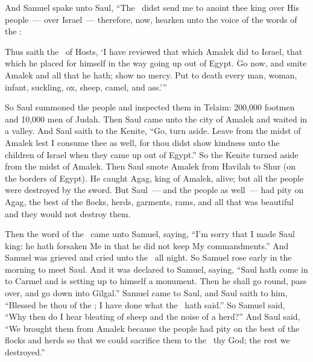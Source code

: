 
\begin{inparaenum}
   And Samuel spake unto Saul, ``The \lord\ didst send me to anoint thee king over His people~--- over Israel~--- therefore, now, hearken unto the voice of the words of the \lord:%

   Thus saith the \lord\ of Hosts, `I have reviewed that which Amalek did to Israel, that which he placed for himself in the way going up out of Egypt.%
   Go now, and smite Amalek and all that he hath; show no mercy. Put to death every man, woman, infant, suckling, ox, sheep, camel, and ass.'''%

   So Saul summoned the people and inspected them in Telaim: 200,000 footmen and 10,000 men of Judah.%
   Then Saul came unto the city of Amalek and waited in a valley.%
   And Saul saith to the Kenite, ``Go, turn aside. Leave from the midst of Amalek lest I consume thee as well, for thou didst show kindness unto the children of Israel when they came up out of Egypt.'' So the Kenite turned aside from the midst of Amalek.%
   Then Saul smote Amalek from Havilah to Shur (on the borders of Egypt).%
   He caught Agag, king of Amalek, alive; but all the people were destroyed by the sword.%
   But Saul~--- and the people as well~--- had pity on Agag, the best of the flocks, herds, garments, rams, and all that was beautiful and they would not destroy them.%

   Then the word of the \lord\ came unto Samuel, saying,%
   ``I'm sorry that I made Saul king: he hath forsaken Me in that he did not keep My commandments.'' And Samuel was grieved and cried unto the \lord\ all night.%
   So Samuel rose early in the morning to meet Saul. And it was declared to Samuel, saying, ``Saul hath come in to Carmel and is setting up to himself a monument. Then he shall go round, pass over, and go down into Gilgal.''%
   Samuel came to Saul, and Saul saith to him, ``Blessed be thou of the \lord; I have done what the \lord\ hath said.''%
   So Samuel said, ``Why then do I hear bleating of sheep and the noise of a herd?''%
   And Saul said, ``We brought them from Amalek because the people had pity on the best of the flocks and herds so that we could sacrifice them to the \lord\ thy God; the rest we destroyed.''%


\end{inparaenum}
